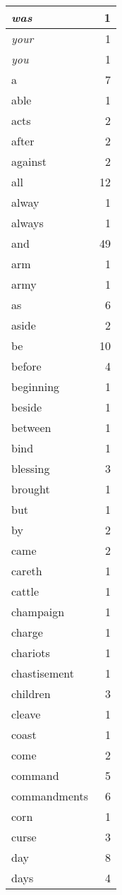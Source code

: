 \begin{center}
\begin{longtable}{l|r}
\emph{was} & 1 \\ \hline
\emph{your} & 1 \\ \hline
\emph{you} & 1 \\ \hline
a & 7 \\ \hline
able & 1 \\ \hline
acts & 2 \\ \hline
after & 2 \\ \hline
against & 2 \\ \hline
all & 12 \\ \hline
alway & 1 \\ \hline
always & 1 \\ \hline
and & 49 \\ \hline
arm & 1 \\ \hline
army & 1 \\ \hline
as & 6 \\ \hline
aside & 2 \\ \hline
be & 10 \\ \hline
before & 4 \\ \hline
beginning & 1 \\ \hline
beside & 1 \\ \hline
between & 1 \\ \hline
bind & 1 \\ \hline
blessing & 3 \\ \hline
brought & 1 \\ \hline
but & 1 \\ \hline
by & 2 \\ \hline
came & 2 \\ \hline
careth & 1 \\ \hline
cattle & 1 \\ \hline
champaign & 1 \\ \hline
charge & 1 \\ \hline
chariots & 1 \\ \hline
chastisement & 1 \\ \hline
children & 3 \\ \hline
cleave & 1 \\ \hline
coast & 1 \\ \hline
come & 2 \\ \hline
command & 5 \\ \hline
commandments & 6 \\ \hline
corn & 1 \\ \hline
curse & 3 \\ \hline
day & 8 \\ \hline
days & 4 \\ \hline

\end{longtable}
\end{center}
